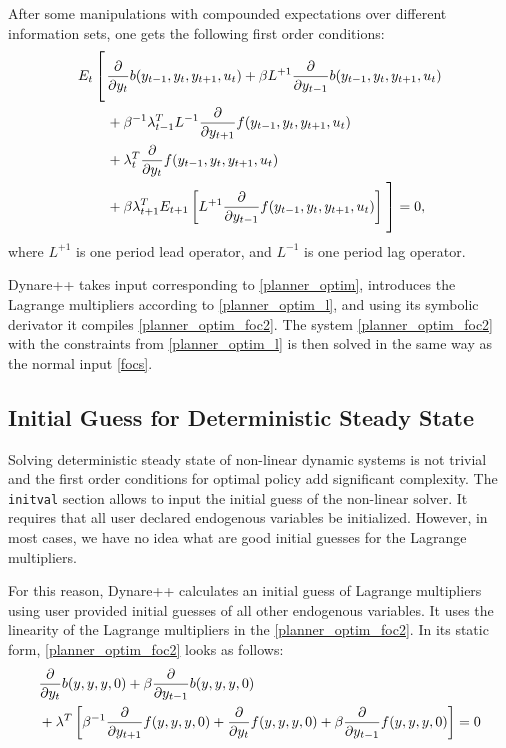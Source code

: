 \documentclass[10pt]{article}
\begin{document}
After some manipulations with compounded expectations over different
information sets, one gets the following first order conditions:
\begin{align}
E_t\left[\vphantom{\frac{\int^(_)}{\int^(\_)}}\right.&\frac{\partial}{\partial y_t}b(y_{t-1},y_t,y_{t+1},u_t)+
\beta L^{+1}\frac{\partial}{\partial y_{t-1}}b(y_{t-1},y_t,y_{t+1},u_t)\notag\\
&+\beta^{-1}\lambda_{t-1}^TL^{-1}\frac{\partial}{\partial y_{t+1}}f(y_{t-1},y_t,y_{t+1},u_t)\notag\\
&+\lambda_t^T\frac{\partial}{\partial y_{t}}f(y_{t-1},y_t,y_{t+1},u_t)\notag\\
&+\beta\lambda_{t+1}^TE_{t+1}\left[L^{+1}\frac{\partial}{\partial y_{t-1}}f(y_{t-1},y_t,y_{t+1},u_t)\right]
\left.\vphantom{\frac{\int^(_)}{\int^(\_)}}\right]
 = 0,\label{planner_optim_foc2}
\end{align}
where $L^{+1}$ is one period lead operator, and $L^{-1}$ is one period lag operator.

Dynare++ takes input corresponding to \eqref{planner_optim},
introduces the Lagrange multipliers according to
\eqref{planner_optim_l}, and using its symbolic derivator it compiles
\eqref{planner_optim_foc2}. The system \eqref{planner_optim_foc2} with
the constraints from \eqref{planner_optim_l} is then solved in the
same way as the normal input \eqref{focs}.

\subsection{Initial Guess for Deterministic Steady State}
\label{opt_init}

Solving deterministic steady state of non-linear dynamic systems is
not trivial and the first order conditions for optimal policy add
significant complexity. The {\tt initval} section allows to input the
initial guess of the non-linear solver. It requires that all user
declared endogenous variables be initialized. However, in most cases,
we have no idea what are good initial guesses for the Lagrange
multipliers.

For this reason, Dynare++ calculates an initial guess of Lagrange
multipliers using user provided initial guesses of all other
endogenous variables. It uses the linearity of the Lagrange
multipliers in the \eqref{planner_optim_foc2}. In its static form,
\eqref{planner_optim_foc2} looks as follows:
\begin{align}
&\frac{\partial}{\partial y_t}b(y,y,y,0)+
\beta\frac{\partial}{\partial y_{t-1}}b(y,y,y,0)\notag\\
&+\lambda^T\left[\beta^{-1}\frac{\partial}{\partial y_{t+1}}f(y,y,y,0)
 +\frac{\partial}{\partial y_{t}}f(y,y,y,0)
 +\beta\frac{\partial}{\partial y_{t-1}}f(y,y,y,0)\right]
 = 0\label{planner_optim_static}
\end{align}
\end{document}
